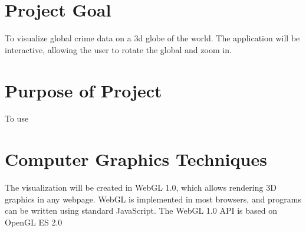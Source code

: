 \documentclass[]{article}
\begin{document}
\section*{Project Goal}

To visualize global crime data on a 3d globe of the world.
The application will be interactive, allowing the user to rotate the global and zoom in.

\section*{Purpose of Project}

To use 

\section*{Computer Graphics Techniques}

The visualization will be created in WebGL 1.0, which allows rendering 3D graphics in any webpage.
WebGL is implemented in most browsers, and programs can be written using standard JavaScript.
The WebGL 1.0 API is based on OpenGL ES 2.0
\end{document}
